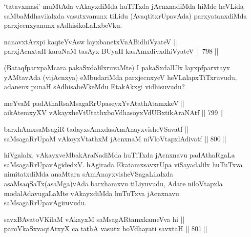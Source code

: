 \begin{artha}
`tatavxmasi' muMtAda vAkayxdiMda huTiTxda jAcnxnadiMda hiMde heVLida saMbaMdhavilalxda vasutxvanunx tiLidu (AvaqtitxrUpavAda) parxyatanxdiMda parxjecnxyanunx sAdhisikoLaLxbeVku.
\end{artha}


\begin{shl}
nanavxtArxpi kaqteYvAsw layxbanetxVnABidhiVyateV || \\
parxjAcnx\s taH karaNaM tasAyx BUyaH kasAmxdivxdhiVyateV \hfill || 798 ||  
\end{shl}

\begin{artha}
(BataqfparxpaMcara pakaSxdalilxruvaMte) I pakaSxdalUlx layxpfparxtayx yAMtavAda (vijAcnxya) eMbudariMda parxjecnxyeV heVLalapxTiTxruvudu, adanenx punaH sAdhisabeVkeMdu EtakAkxgi vidhisuvudu?
\end{artha}

\begin{shl}
meYvaM padAthaRsaMsagaRrUpaseyxYvAtathAtamxkeV || \\
aikAtemxyXV vAkayxheVtUtathxboVdhasoyxVdUBxtikAraNAtf \hfill || 799 ||  
\end{shl}
				
\begin{shl}
barxhAmxsaMsagiR tadayxsAmxdasAmAnayxvisheVSavatf || \\
saMsagaRrUpaM vAkoyxVtathxM jAcnxnaM niVloVtapxlAdivatf \hfill || 800 ||  
\end{shl}

\begin{artha}
hiVgalalx, vAkayxveMbakAraNadiMda huTiTxda jAcnxnavu padAthaRgaLa saMsagaRrUpavAgidedxV. hAgirada EkatamxsavxrUpa viSayadalilx huTuTxva nimitatxdiMda anaMtara sAmAnayxvisheVSagaLilalxda asaMsaqSaTx(asaMga)vAda barxhamxvu tiLiyuvudu, Adare niloVtapxla modalAdavugaLaMte vAkayxdiMda huTuTxva jAcnxnavu saMsagaRrUpavAgiruvudu.
\end{artha}


\begin{shl}
savxBAvatoV\s KilaM vAkayxM saMsagARtamxkameVva hi || \\
paroVkaSxvaqtAtxyX ca tathA vasutx boVdhayati savxtaH \hfill || 801 ||  
\end{shl}


